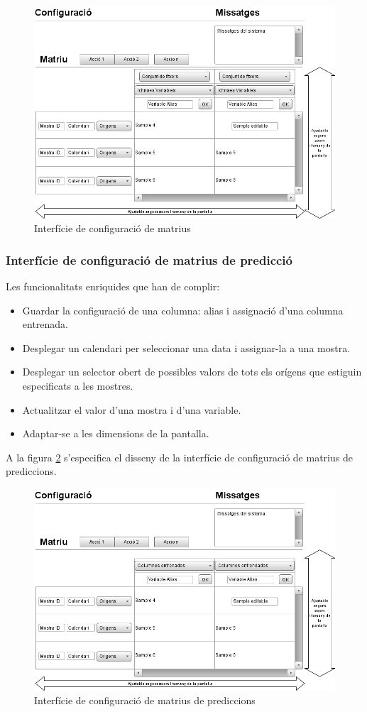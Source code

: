 \begin{figure}[H]
  \centering
  \includegraphics[scale=0.5]{img/design/Interficiedeconfiguracio.png}
  \caption{Interfície de configuració de matrius}
  \label{fig:interfacematrixconf}
\end{figure}


\subsubsection{Interf\'{i}cie de configuraci\'{o} de matrius de predicció}
Les funcionalitats enriquides que han de complir:
\begin{itemize}
\item Guardar la configuració de una columna: alias i assignació d'una columna entrenada.
\item Desplegar un calendari per seleccionar una data i assignar-la a una mostra.
\item Desplegar un selector obert de possibles valors de tots els orígens que estiguin especificats a les mostres.
\item Actualitzar el valor d'una mostra i d'una variable.
\item Adaptar-se a les dimensions de la pantalla.
\end{itemize}

A la figura \ref{fig:interfacematrixpredictionconf} s'especifica el disseny de la interfície de configuraci\'{o} de matrius de prediccions.

\begin{figure}[H]
  \centering
  \includegraphics[scale=0.5]{img/design/Interficiedeconfiguraciopredi.png}
  \caption{Interfície de configuració de matrius de prediccions}
  \label{fig:interfacematrixpredictionconf}
\end{figure}

